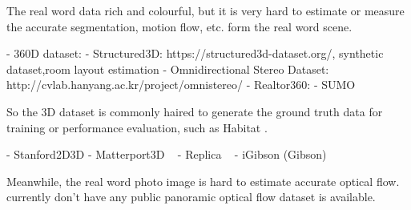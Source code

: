 The real word data rich and colourful, but it is very hard to estimate or measure the accurate segmentation, motion flow, etc. form the real word scene.

- 360D dataset:
- Structured3D: https://structured3d-dataset.org/, synthetic dataset,room layout estimation
- Omnidirectional Stereo Dataset: http://cvlab.hanyang.ac.kr/project/omnistereo/
- Realtor360: 
- SUMO

So the 3D dataset is commonly haired to generate the ground truth data for training or performance evaluation, such as Habitat \cite{SavvaKMZWJSLKMPB2019}.

- Stanford2D3D \cite{ArmenSZS2017}
- Matterport3D ~\cite{ChangDFHNSSZZ2017}
- Replica ~\cite{StrauWMCWGEMRVCYBYPYZLCBGMPSBSNGLN2019}
- iGibson (Gibson)


Meanwhile, the real word photo image is hard to estimate accurate optical flow.
 currently don't have any public panoramic optical flow dataset is available.
